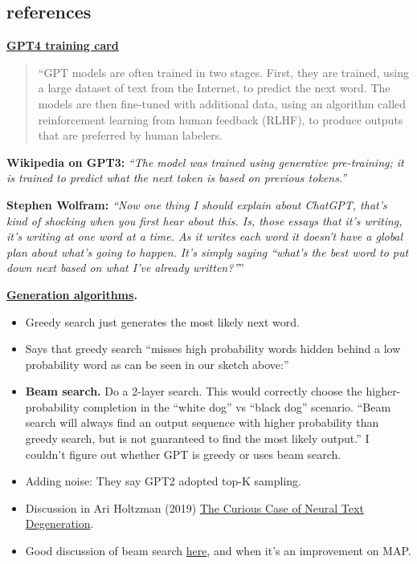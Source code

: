 \documentclass[
  11pt,
  letterpaper,
  DIV=11,
  numbers=noendperiod,
  oneside]{scrartcl}
\providecommand{\tightlist}{%
  \setlength{\itemsep}{0pt}\setlength{\parskip}{0pt}}\usepackage{longtable,booktabs,array}
\begin{document}
\hypertarget{references}{%
\subsection{references}\label{references}}

\textbf{\href{https://cdn.openai.com/papers/gpt-4-system-card.pdf}{GPT4
training card}}

\begin{quote}
``GPT models are often trained in two stages. First, they are trained,
using a large dataset of text from the Internet, to predict the next
word. The models are then fine-tuned with additional data, using an
algorithm called reinforcement learning from human feedback (RLHF), to
produce outputs that are preferred by human labelers.
\end{quote}

\textbf{Wikipedia on GPT3:} \emph{``The model was trained using
generative pre-training; it is trained to predict what the next token is
based on previous tokens.''}

\textbf{Stephen Wolfram:} \emph{``Now one thing I should explain about
ChatGPT, that's kind of shocking when you first hear about this. Is,
those essays that it's writing, it's writing at one word at a time. As
it writes each word it doesn't have a global plan about what's going to
happen. It's simply saying ``what's the best word to put down next based
on what I've already written?''}''

\textbf{\href{https://huggingface.co/blog/how-to-generate}{Generation
algorithms}.}

\begin{itemize}
\tightlist
\item
  Greedy search just generates the most likely next word.
\item
  Says that greedy search ``misses high probability words hidden behind
  a low probability word as can be seen in our sketch above:''
\item
  \textbf{Beam search.} Do a 2-layer search. This would correctly choose
  the higher-probability completion in the ``white dog'' vs ``black
  dog'' scenario. ``Beam search will always find an output sequence with
  higher probability than greedy search, but is not guaranteed to find
  the most likely output.'' I couldn't figure out whether GPT is greedy
  or uses beam search.
\item
  Adding noise: They say GPT2 adopted top-K sampling.
\item
  Discussion in Ari Holtzman (2019)
  \href{https://arxiv.org/abs/1904.09751}{The Curious Case of Neural
  Text Degeneration}.
\item
  Good discussion of beam search
  \href{https://arxiv.org/abs/2010.02650}{here}, and when it's an
  improvement on MAP.
\end{itemize}
\end{document}

